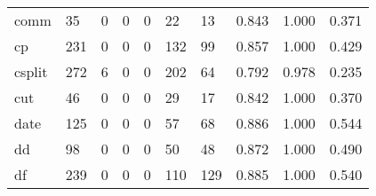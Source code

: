 \begin{longtable}{lp{2.0cm}p{2.0cm}p{2.0cm}p{2.0cm}p{2.0cm}p{2.0cm}p{2.0cm}p{2.0cm}p{2.0cm}}
comm      &                     35 &                                             0 &                                            0 &                                           0 &                                           22 &                                         13 &                                0.843 &                                  1.000 &                                0.371 \\
cp        &                    231 &                                             0 &                                            0 &                                           0 &                                          132 &                                         99 &                                0.857 &                                  1.000 &                                0.429 \\
csplit    &                    272 &                                             6 &                                            0 &                                           0 &                                          202 &                                         64 &                                0.792 &                                  0.978 &                                0.235 \\
cut       &                     46 &                                             0 &                                            0 &                                           0 &                                           29 &                                         17 &                                0.842 &                                  1.000 &                                0.370 \\
date      &                    125 &                                             0 &                                            0 &                                           0 &                                           57 &                                         68 &                                0.886 &                                  1.000 &                                0.544 \\
dd        &                     98 &                                             0 &                                            0 &                                           0 &                                           50 &                                         48 &                                0.872 &                                  1.000 &                                0.490 \\
df        &                    239 &                                             0 &                                            0 &                                           0 &                                          110 &                                        129 &                                0.885 &                                  1.000 &                                0.540 \\

\end{longtable}
